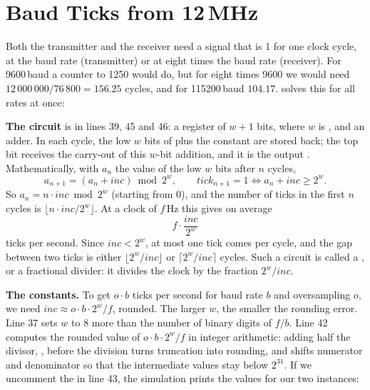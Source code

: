 \section{Baud Ticks from \texorpdfstring{12\,MHz}{12 MHz}}
\label{sec:step06-baud}

Both the transmitter and the receiver need a signal that is 1 for one clock
cycle, at the baud rate (transmitter) or at eight times the baud rate
(receiver). For 9600\,baud a counter to 1250 would do, but for eight times
9600 we would need $12\,000\,000 / 76\,800 = 156.25$ cycles, and for 115200\,baud
$104.17$.  solves this for all rates at once:


\textbf{The circuit} is in lines 39, 45 and 46: a register  of $w + 1$
bits, where $w$ is , and an adder. In each cycle, the low $w$
bits of  plus the constant  are stored back; the top bit
 receives the carry-out of this $w$-bit addition, and it is the
output . Mathematically, with $a_n$ the value of the low $w$ bits
after $n$ cycles,
\[
  a_{n+1} = (a_n + \mathit{inc}) \bmod 2^w, \qquad
  \mathit{tick}_{n+1} = 1 \iff a_n + \mathit{inc} \ge 2^w .
\]
So $a_n = n \cdot \mathit{inc} \bmod 2^w$ (starting from 0), and the number of
ticks in the first $n$ cycles is $\lfloor n \cdot \mathit{inc} / 2^w \rfloor$.
At a clock of $f$\,Hz this gives on average
\[
  f \cdot \frac{\mathit{inc}}{2^w}
\]
ticks per second. Since $\mathit{inc} < 2^w$, at most one tick comes per
cycle, and the gap between two ticks is either $\lfloor 2^w /
\mathit{inc}\rfloor$ or $\lceil 2^w / \mathit{inc}\rceil$ cycles. Such a
circuit is called a , or a fractional divider: it
divides the clock by the fraction $2^w / \mathit{inc}$.

\textbf{The constants.} To get $o \cdot b$ ticks per second for baud rate $b$
and oversampling $o$, we need $\mathit{inc} \approx o \cdot b \cdot 2^w / f$,
rounded. The larger $w$, the smaller the rounding error. Line 37 sets $w$ to 8
more than the number of binary digits of $f / b$. Line 42 computes the rounded
value of $o \cdot b \cdot 2^w / f$ in integer arithmetic: adding half the
divisor, , before the division turns
truncation into rounding, and  shifts numerator and
denominator so that the intermediate values stay below $2^{31}$. If we
uncomment the  in line 43, the simulation prints the values for
our two instances:


